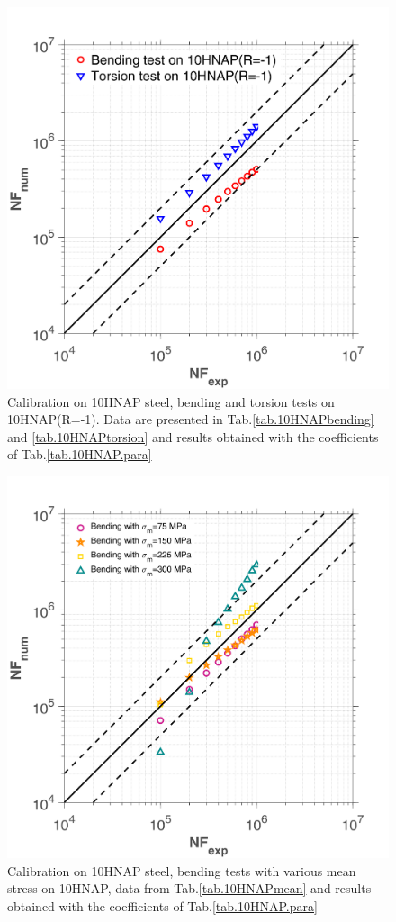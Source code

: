 \documentclass[3p,times,procedia,number]{elsarticle}
\begin{document}
\begin{figure}[!h]
	\centering
	\includegraphics[width=\textwidth]{figures//10HNAP_bt1D_err.png} 
	\caption{Calibration on 10HNAP steel, bending and torsion tests on 10HNAP(R=-1). Data are presented in Tab.\ref{tab.10HNAPbending} and  \ref{tab.10HNAPtorsion} and results obtained with the coefficients of Tab.\ref{tab.10HNAP.para}}
	\label{fig.10HNAP1}
\end{figure}
\begin{figure}[!h]
	\centering
	\includegraphics[width=\textwidth]{figures//10HNAP_b1D_m_err.png} 
	\caption{Calibration on 10HNAP steel, bending tests with various mean stress on 10HNAP, data from Tab.\ref{tab.10HNAPmean}  and results obtained with the coefficients of Tab.\ref{tab.10HNAP.para}}
	\label{fig.10HNAP2}
\end{figure}
\end{document}
